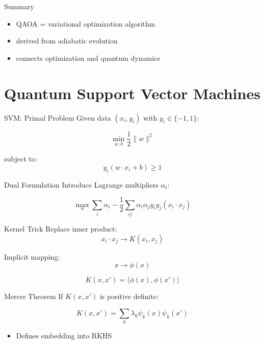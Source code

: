 \documentclass{beamer}
\begin{document}
\begin{frame}{Summary}
\begin{itemize}
\item QAOA = variational optimization algorithm
\item derived from adiabatic evolution
\item connects optimization and quantum dynamics
\end{itemize}
\end{frame}

\section{Quantum Support Vector Machines}

\begin{frame}{SVM: Primal Problem}
Given data $(x_i,y_i)$ with $y_i \in \{-1,1\}$:

\[
\min_{w,b} \frac{1}{2}\|w\|^2
\]

subject to:
\[
y_i(w \cdot x_i + b) \ge 1
\]
\end{frame}

\begin{frame}{Dual Formulation}
Introduce Lagrange multipliers $\alpha_i$:

\[
\max_{\alpha}
\sum_i \alpha_i
-
\frac{1}{2}\sum_{ij} \alpha_i \alpha_j y_i y_j (x_i \cdot x_j)
\]
\end{frame}

\begin{frame}{Kernel Trick}
Replace inner product:
\[
x_i \cdot x_j \rightarrow K(x_i,x_j)
\]

Implicit mapping:
\[
x \rightarrow \phi(x)
\]

\[
K(x,x') = \langle \phi(x), \phi(x') \rangle
\]
\end{frame}

\begin{frame}{Mercer Theorem}
If $K(x,x')$ is positive definite:

\[
K(x,x') = \sum_k \lambda_k \psi_k(x)\psi_k(x')
\]

\begin{itemize}
\item Defines embedding into RKHS
\end{itemize}
\end{frame}
\end{document}
